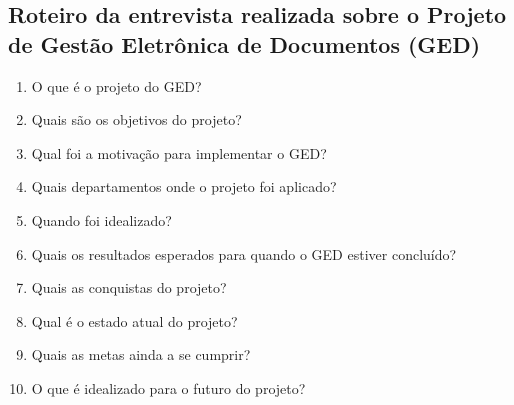\begin{apendicesenv}
\chapter{Roteiro da entrevista realizada sobre o Projeto de Gestão Eletrônica de Documentos (GED)}

\begin{enumerate}
    \item O que é o projeto do GED?
    \item Quais são os objetivos do projeto?
    \item Qual foi a motivação para implementar o GED?
    \item Quais departamentos onde o projeto foi aplicado?
    \item Quando foi idealizado?
    \item Quais os resultados esperados para quando o GED estiver concluído?
    \item Quais as conquistas do projeto?
    \item Qual é o estado atual do projeto?
    \item Quais as metas ainda a se cumprir?
    \item O que é idealizado para o futuro do projeto?
\end{enumerate}

\end{apendicesenv} 
